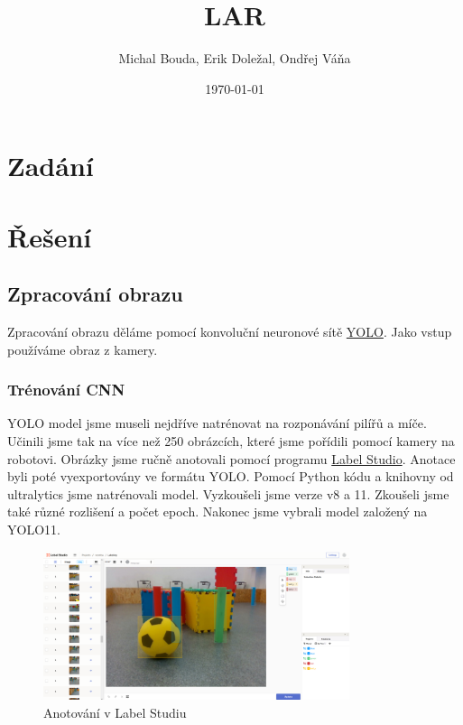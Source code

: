 \documentclass[a4paper,12pt]{article}
\title{LAR}
\author{Michal Bouda, Erik Doležal, Ondřej Váňa}
\date{\today}
\begin{document}
\maketitle

\tableofcontents

\section{Zadání}
\section{Řešení}
\subsection{Zpracování obrazu}
Zpracování obrazu děláme pomocí konvoluční neuronové sítě \href{https://docs.ultralytics.com/models/}{YOLO}. Jako vstup používáme obraz z kamery.
\subsubsection{Trénování CNN}
YOLO model jsme museli nejdříve natrénovat na rozponávání pilířů a míče. Učinili jsme tak na více než 250 obrázcích,
které jsme pořídili pomocí kamery na robotovi. Obrázky jsme ručně anotovali pomocí programu \href{https://labelstud.io/}{Label Studio}. Anotace byli poté vyexportovány ve formátu YOLO.
Pomocí Python kódu a knihovny od ultralytics jsme natrénovali model. Vyzkoušeli jsme verze v8 a 11. Zkoušeli jsme také různé rozlišení a počet epoch.
Nakonec jsme vybrali model založený na YOLO11.
\begin{figure}[H]
    \centering
    \includegraphics[width=0.8\textwidth]{pictures/label_studio.png}
    \caption{Anotování v Label Studiu}
\end{figure}
\end{document}
